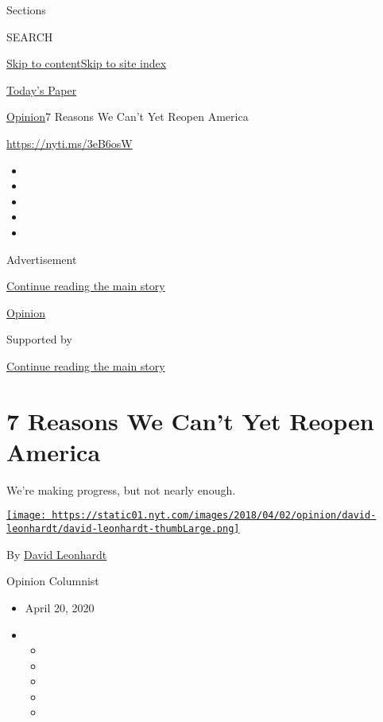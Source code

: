 Sections

SEARCH

\protect\hyperlink{site-content}{Skip to
content}\protect\hyperlink{site-index}{Skip to site index}

\href{https://myaccount.nytimes.com/auth/login?response_type=cookie\&client_id=vi}{}

\href{https://www.nytimes.com/section/todayspaper}{Today's Paper}

\href{/section/opinion}{Opinion}\textbar{}7 Reasons We Can't Yet Reopen
America

\href{https://nyti.ms/3eB6osW}{https://nyti.ms/3eB6osW}

\begin{itemize}
\item
\item
\item
\item
\item
\end{itemize}

Advertisement

\protect\hyperlink{after-top}{Continue reading the main story}

\href{/section/opinion}{Opinion}

Supported by

\protect\hyperlink{after-sponsor}{Continue reading the main story}

\hypertarget{7-reasons-we-cant-yet-reopen-america}{%
\section{7 Reasons We Can't Yet Reopen
America}\label{7-reasons-we-cant-yet-reopen-america}}

We're making progress, but not nearly enough.

\href{https://www.nytimes.com/by/david-leonhardt}{\texttt{[image: https://static01.nyt.com/images/2018/04/02/opinion/david-leonhardt/david-leonhardt-thumbLarge.png]}}

By \href{https://www.nytimes.com/by/david-leonhardt}{David Leonhardt}

Opinion Columnist

\begin{itemize}
\item
  April 20, 2020
\item
  \begin{itemize}
  \item
  \item
  \item
  \item
  \item
  \end{itemize}
\end{itemize}

